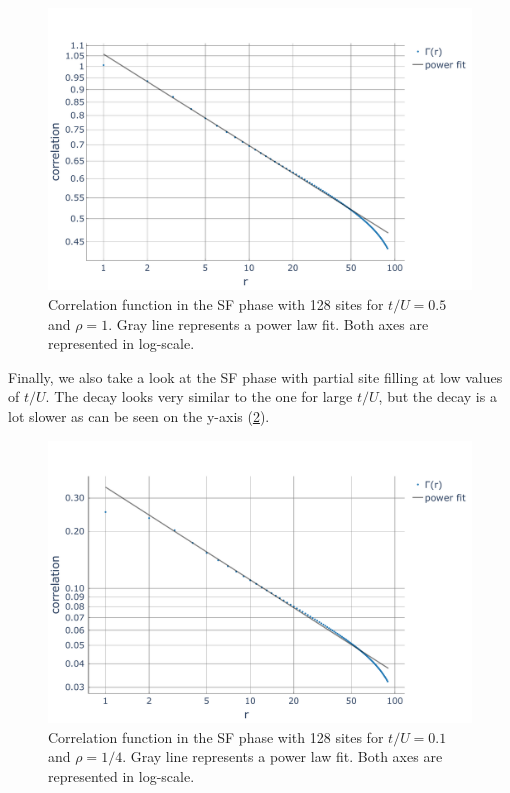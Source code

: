 \documentclass[twoside,twocolumn,9pt]{article}
\begin{document}
\begin{center}
  \begin{figure}
      \includegraphics[width=\linewidth]{../code/figures/Correlations-SF1.pdf}
      \caption{Correlation function in the SF phase with 128 sites for $t/U=0.5$ and $\rho=1$. Gray line represents a power law fit. Both axes are represented in log-scale.}
      \label{fig:corSF1}
  \end{figure}
\end{center}
Finally, we also take a look at the SF phase with partial site filling at low values of $t/U$. The decay looks very similar to the one for large $t/U$, but the decay is a lot slower as can be seen on the y-axis (\cref{fig:corSF2}). 
\begin{center}
  \begin{figure}
      \includegraphics[width=\linewidth]{../code/figures/Correlations-SF2.pdf}
      \caption{Correlation function in the SF phase with 128 sites for $t/U=0.1$ and $\rho=1/4$. Gray line represents a power law fit. Both axes are represented in log-scale.}
      \label{fig:corSF2}
  \end{figure}
\end{center}
\end{document}
